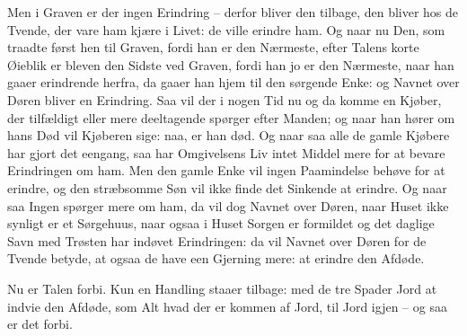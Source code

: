 \documentclass[12pt,a4paper]{article}
\begin{document}
Men i Graven er der ingen Erindring – derfor bliver den tilbage, den bliver hos de Tvende, der vare ham kjære i Livet: de ville erindre ham. Og naar nu Den, som traadte først hen til Graven, fordi han er den Nærmeste, efter Talens korte Øieblik er bleven den Sidste ved Graven, fordi han jo er den Nærmeste, naar han gaaer erindrende herfra, da gaaer han hjem til den sørgende Enke: og Navnet over Døren bliver en Erindring. Saa vil der i nogen Tid nu og da komme en Kjøber, der tilfældigt eller mere deeltagende spørger efter Manden; og naar han hører om hans Død vil Kjøberen sige: naa, er han død. Og naar saa alle de gamle Kjøbere har gjort det eengang, saa har Omgivelsens Liv intet Middel mere for at bevare Erindringen om ham. Men den gamle Enke vil ingen Paamindelse behøve for at erindre, og den stræbsomme Søn vil ikke finde det Sinkende at erindre. Og naar saa Ingen spørger mere om ham, da vil dog Navnet over Døren, naar Huset ikke synligt er et Sørgehuus, naar ogsaa i Huset Sorgen er formildet og det daglige Savn med Trøsten har indøvet Erindringen: da vil Navnet over Døren for de Tvende betyde, at ogsaa de have een Gjerning mere: at erindre den Afdøde.

Nu er Talen forbi. Kun en Handling staaer tilbage: med de tre Spader Jord at indvie den Afdøde, som Alt hvad der er kommen af Jord, til Jord igjen – og saa er det forbi.
\end{document}
